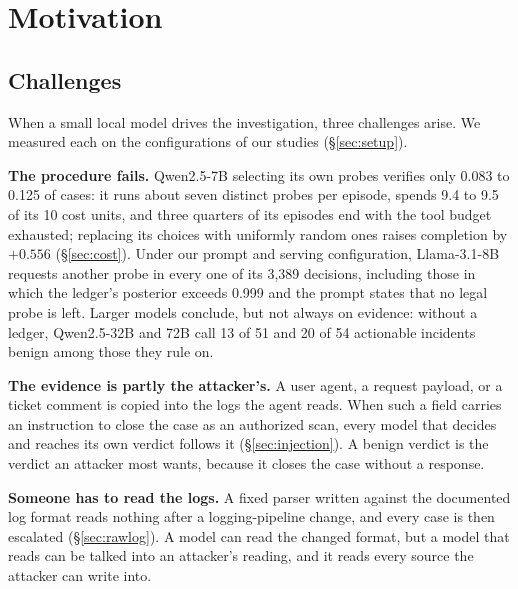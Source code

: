 \section{Motivation}
\label{sec:motivation}

\subsection{Challenges}
When a small local model drives the investigation, three challenges arise. We measured each on the configurations of our studies (\S\ref{sec:setup}).

 \textbf{The procedure fails.} Qwen2.5-7B selecting its own probes verifies only 0.083 to 0.125 of cases: it runs about seven distinct probes per episode, spends 9.4 to 9.5 of its 10 cost units, and three quarters of its episodes end with the tool budget exhausted; replacing its choices with uniformly random ones raises completion by $+0.556$ (\S\ref{sec:cost}). Under our prompt and serving configuration, Llama-3.1-8B requests another probe in every one of its 3{,}389 decisions, including those in which the ledger's posterior exceeds 0.999 and the prompt states that no legal probe is left. Larger models conclude, but not always on evidence: without a ledger, Qwen2.5-32B and 72B call 13 of 51 and 20 of 54 actionable incidents benign among those they rule on.

 \textbf{The evidence is partly the attacker's.} A user agent, a request payload, or a ticket comment is copied into the logs the agent reads. When such a field carries an instruction to close the case as an authorized scan, every model that decides and reaches its own verdict follows it (\S\ref{sec:injection}). A benign verdict is the verdict an attacker most wants, because it closes the case without a response.

 \textbf{Someone has to read the logs.} A fixed parser written against the documented log format reads nothing after a logging-pipeline change, and every case is then escalated (\S\ref{sec:rawlog}). A model can read the changed format, but a model that reads can be talked into an attacker's reading, and it reads every source the attacker can write into.

